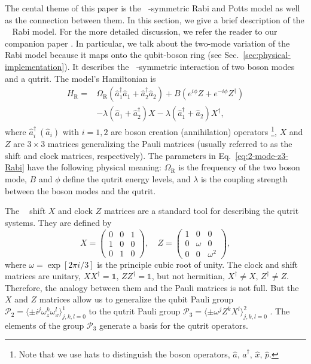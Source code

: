 \documentclass[reprint, aps, prx, amsmath, amssymb, longbibliography, superscriptaddress]{revtex4-2}
\DeclareMathOperator{\Zthree}{\mathbb{Z}_3}
\begin{document}
The cental theme of this paper is the $\Zthree$-symmetric Rabi and Potts model as well as the connection between them. In this section, we give a brief description of the $\Zthree$ Rabi model. For the more detailed discussion, we refer the reader to our companion paper \cite{lotkov_cat_}. In particular, we talk about the two-mode variation of the $\Zthree$ Rabi model because it maps onto the qubit-boson ring (see Sec.~\ref{sec:physical-implementation}). It describes the $\Zthree$-symmetric interaction of two boson modes and a qutrit. The model's Hamiltonian is
\begin{equation}
\label{eq:2-mode-z3-Rabi}
\begin{aligned}
     H_{\text{R}} = &\Omega_{\text{R}} (\hat a_1^{\dagger} \hat a_1 + \hat a_2^{\dagger} \hat a_2) + B (e^{i\phi} Z + e^{-i\phi} Z^{\dagger}) \\
    &- \lambda (\hat a_1 + \hat a_2^{\dagger}) X - \lambda (\hat a_1^{\dagger} + \hat a_2) X^{\dagger},
\end{aligned}
\end{equation}
where $\hat a_i^{\dagger}\  (\hat a_i)$ with $i = 1,2$ are boson creation (annihilation) operators \footnote{Note that we use hats to distinguish the boson operators, $\hat a,\, \hat a^{\dagger},\, \hat x, \,\hat p$.}, $X$ and $Z$ are $3\times 3 $ matrices generalizing the Pauli matrices (usually referred to as the shift and clock matrices, respectively). The parameters in Eq.~\eqref{eq:2-mode-z3-Rabi} have the following physical meaning: $\Omega_{\text{R}}$ is the frequency of the two boson mode, $B$ and $\phi$ define the qutrit energy levels, and $\lambda$ is the coupling strength between the boson modes and the qutrit.

The $\Zthree$ shift $X$ and clock $Z$ matrices are a standard tool for describing the qutrit systems.  They are defined by
\begin{equation}
\label{eq:shift-clock-matreces}
    X = \begin{pmatrix} 
         0 & 0 & 1 \\
         1 & 0 & 0 \\
         0 & 1 & 0 
        \end{pmatrix}, \quad
    Z = \begin{pmatrix}
         1 & 0 & 0 \\
         0 & \omega & 0 \\
         0 & 0 & \omega^2
        \end{pmatrix},
      \end{equation}
where $\omega = \exp[2\pi i/3]$ is the principle cubic root of unity. The clock and shift matrices are unitary, $ X X^{\dagger} = \mathbb{1}, \, Z Z^{\dagger} = \mathbb{1}$, but not hermitian, $ X^{\dagger} \neq X, \, Z^{\dagger} \neq Z$. Therefore, the analogy between them and the Pauli matrices is not full. But the $X$ and $Z$ matrices allow us to generalize the qubit Pauli group $\mathcal{P}_2 = \langle \pm i^j \omega_z^k \omega_x^l\rangle_{j,k,l = 0}^1$ to the qutrit Pauli group $\mathcal{P}_3 = \langle \pm \omega^j Z^k X^l\rangle_{j,k,l= 0}^{2}$ . The elements of the group $\mathcal{P}_3$ generate a basis for the qutrit operators.
\end{document}
